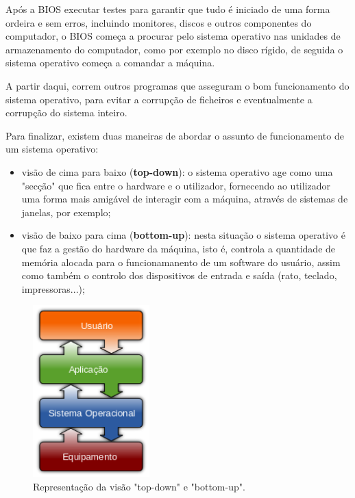 \documentclass{report}
\begin{document}
Após a BIOS executar testes para garantir que tudo é iniciado de uma forma ordeira e sem erros, incluindo monitores, discos e outros componentes do computador, o BIOS começa a procurar pelo sistema operativo nas unidades de armazenamento do computador, como por exemplo no disco rígido, de seguida o sistema operativo começa a comandar a máquina.

A partir daqui, correm outros programas que asseguram o bom funcionamento do sistema operativo, para evitar a corrupção de ficheiros e eventualmente a corrupção do sistema inteiro.

\vspace{5mm} %

Para finalizar, existem duas maneiras de abordar o assunto de funcionamento de um sistema operativo:

\begin{itemize}
    \item visão de cima para baixo (\textbf{top-down}): o sistema operativo age como uma "secção" que fica entre o hardware e o utilizador, fornecendo ao utilizador uma forma mais amigável de interagir com a máquina, através de sistemas de janelas, por exemplo;
    \item visão de baixo para cima (\textbf{bottom-up}): nesta situação o sistema operativo é que faz a gestão do hardware da máquina, isto é, controla a quantidade de memória alocada para o funcionamanento de um software do usuário, assim como também o controlo dos dispositivos de entrada e saída (rato, teclado, impressoras...);
\end{itemize}

\begin{figure}[h!]
\includegraphics[width=0.4\textwidth]{img_so.png}
\centering
\caption{Representação da visão "top-down" e "bottom-up".}
\end{figure}
\end{document}

